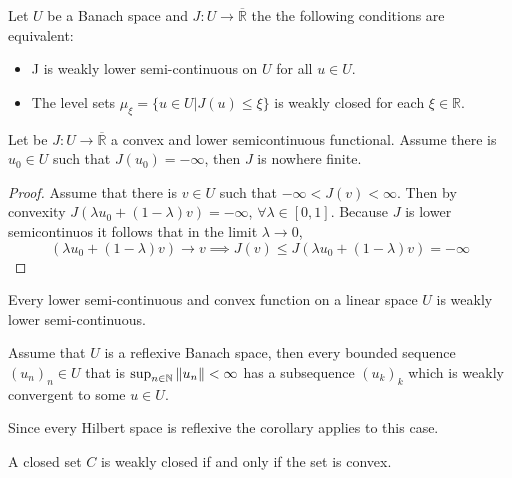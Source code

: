 \begin{theorem}
	\label{th4. wlsc and level sets.}
	Let $U$ be a Banach space and $J:U \rightarrow \overline{\mathbb{R}}$ the the following conditions are equivalent:
	\begin{itemize}
		\item J is weakly lower semi-continuous on $U$ for all $u\in U$.
		\item The level sets $\mu_\xi = \lbrace u \in U | J(u)\leq \xi \rbrace$ is weakly closed for each $\xi \in \mathbb{R}$.
	\end{itemize}
\end{theorem}

\begin{lemma}
	Let be $J: U \rightarrow \overline{\mathbb{R}}$ a convex and lower semicontinuous functional. Assume there is $u_0 \in U$ such that $J(u_0)=-\infty$, then $J$ is nowhere finite.
	\begin{proof}
		Assume that there is $v\in U$ such that $-\infty< J(v)< \infty$. Then by convexity $J(\lambda u_0 + (1-\lambda)v)=- \infty$, $\forall \lambda \in [0,1]$. Because $J$ is lower semicontinuos it follows that in the limit $\lambda \rightarrow 0$, 
		\[
			(\lambda u_0 +(1-\lambda)v) \rightarrow v \implies J(v)\leq J(\lambda u_0 +(1-\lambda)v)=-\infty
		\]
	\end{proof}
\end{lemma}
\begin{lemma}
	Every lower semi-continuous and convex function on a linear space $U$ is weakly lower semi-continuous.
\end{lemma}

\begin{corollary}
	Assume that $U$ is a reflexive Banach space, then every bounded sequence $(u_n)_n \in U$ that is $\sup_{n\in \mathbb{N}} \left\lVert u_n\right\rVert<\infty$ has a subsequence $(u_k)_k$ which is weakly convergent to some $u\in U$. 
\end{corollary}

\begin{remark}
	Since every Hilbert space is reflexive the corollary applies to this case.
\end{remark}

\begin{lemma}
	A closed set $C$ is weakly closed if and only if the set is convex.
\end{lemma}

